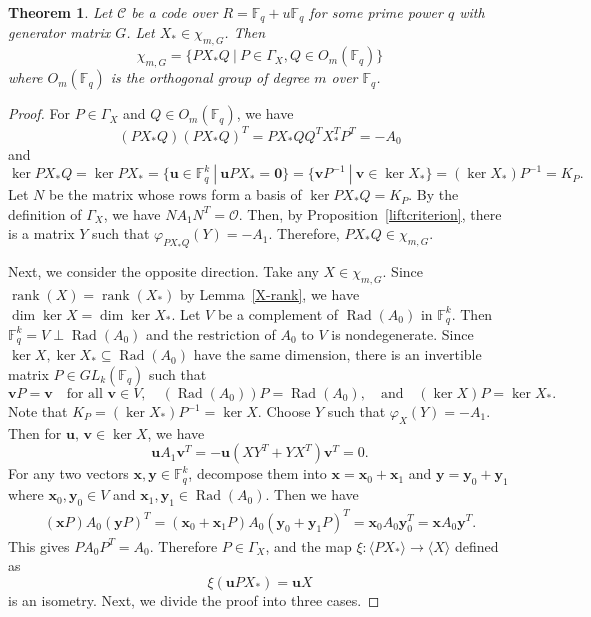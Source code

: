 \documentclass{article}
\newtheorem{theorem}{Theorem}[section]
\theoremstyle{definition}
\theoremstyle{remark}
\begin{document}
\begin{theorem}\label{everychi}
    Let $\mathcal{C}$ be a code over $R=\mathbb{F}_q+u\mathbb{F}_q$ for some prime power $q$ with generator matrix $G$. Let $X_*\in \chi_{m, G}$. Then
    \[
    \chi_{m, G}=\{PX_*Q~|~P\in\Gamma_X, Q\in O_m(\mathbb{F}_q)\}
    \]
    where $O_m(\mathbb{F}_q)$ is the orthogonal group of degree $m$ over $\mathbb{F}_q$.
\end{theorem}
\begin{proof}
    For $P\in\Gamma_X$ and $Q\in O_m(\mathbb{F}_q)$, we have
    \[
    (PX_*Q)(PX_*Q)^T=PX_*QQ^TX_*^TP^T=-A_0
    \]
    and
    \[
    \ker PX_*Q=\ker PX_*=\{\mathbf{u}\in \mathbb{F}_q^k~|~\mathbf{u}PX_*=\mathbf{0}\}=\{\mathbf{v}P^{-1}~|~\mathbf{v}\in \ker X_*\}=(\ker X_*)P^{-1}=K_P.
    \]
    Let $N$ be the matrix whose rows form a basis of $\ker PX_*Q=K_P$. By the definition of $\Gamma_X$, we have $NA_1N^T=\mathcal{O}$. Then, by Proposition~\ref{liftcriterion}, there is a matrix $Y$ such that $\varphi_{PX_*Q}(Y)=-A_1$. Therefore, $PX_*Q\in \chi_{m, G}$.
    
    Next, we consider the opposite direction. Take any $X\in\chi_{m, G}$. Since $\operatorname{rank}(X)=\operatorname{rank}(X_*)$ by Lemma~\ref{X-rank}, we have $\dim\ker X=\dim\ker X_*$. Let $V$ be a complement of $\operatorname{Rad}(A_0)$ in $\mathbb{F}_q^k$. Then $\mathbb{F}_q^k=V\perp \operatorname{Rad}(A_0)$ and the restriction of $A_0$ to $V$ is nondegenerate. Since $\ker X, \ker X_*\subseteq \operatorname{Rad}(A_0)$ have the same dimension, there is an invertible matrix $P\in GL_k(\mathbb{F}_q)$ such that
    \[
    \mathbf{v}P=\mathbf{v}\quad\mbox{for all }\mathbf{v}\in V,\quad (\operatorname{Rad}(A_0))P=\operatorname{Rad}(A_0),\quad\mbox{and}\quad(\ker X)P=\ker X_*.
    \]
    Note that $K_P=(\ker X_*)P^{-1}=\ker X$. Choose $Y$ such that $\varphi_X(Y)=-A_1$. Then for $\mathbf{u},\,\mathbf{v}\in \ker X$, we have
    \begin{equation}\label{everychi-eq}
        \mathbf{u}A_1\mathbf{v}^T=-\mathbf{u}(XY^T+YX^T)\mathbf{v}^T=0.
    \end{equation}
    For any two vectors $\mathbf{x}, \mathbf{y}\in \mathbb{F}_q^k$, decompose them into $\mathbf{x}=\mathbf{x}_0+\mathbf{x}_1$ and $\mathbf{y}=\mathbf{y}_0+\mathbf{y}_1$ where $\mathbf{x}_0, \mathbf{y}_0\in V$ and $\mathbf{x}_1, \mathbf{y}_1\in \operatorname{Rad}(A_0)$. Then we have
    \begin{align*}
    (\mathbf{x}P)A_0(\mathbf{y}P)^T=(\mathbf{x}_0+\mathbf{x}_1P)A_0(\mathbf{y}_0+\mathbf{y}_1P)^T=\mathbf{x}_0A_0\mathbf{y}_0^T=\mathbf{x}A_0\mathbf{y}^T.
    \end{align*}
    This gives $PA_0P^T=A_0$. Therefore $P\in\Gamma_X$, and the map $\xi:\langle PX_*\rangle\to \langle X\rangle$ defined as
    \[
    \xi(\mathbf{u}PX_*)=\mathbf{u}X
    \]
    is an isometry. Next, we divide the proof into three cases. 


\end{proof}
\end{document}
